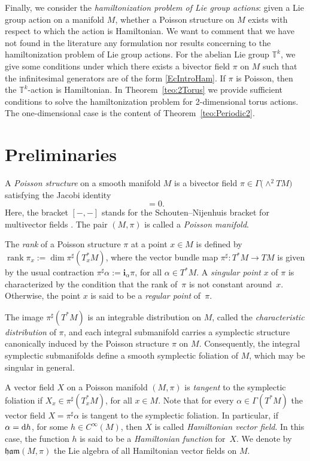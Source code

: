 \documentclass[10pt,a4paper]{amsart}
\newcommand{\dd}{{\rm d}}
\newcommand{\ii}{\mathbf{i}}
\numberwithin{equation}{section}
\begin{document}
Finally, we consider the \emph{hamiltonization problem of Lie group actions}: given a Lie group action on a manifold $M$, whether a Poisson structure on $M$ exists with respect to which the action is Hamiltonian. We want to comment that we have not found in the literature any formulation nor results concerning to the hamiltonization problem of Lie group actions. For the abelian Lie group $\mathbb{T}^k$, we give some conditions under which there exists a bivector field $\pi$ on $M$ such that the infinitesimal generators are of the form \eqref{EcIntroHam}. If $\pi$ is Poisson, then the $\mathbb{T}^k$-action is Hamiltonian. In Theorem~\ref{teo:2Torus} we provide sufficient conditions to solve the hamiltonization problem for 2-dimensional torus actions. The one-dimensional case is the content of Theorem~\ref{teo:Periodic2}.

\section{Preliminaries} %

A \emph{Poisson structure} on a smooth manifold $M$ is a bivector field $\pi \in \Gamma \big({\wedge}^2 TM\big)$ satisfying the Jacobi identity
 \begin{equation*}
 [\pi,\pi] = 0.
 \end{equation*}
Here, the bracket $[-,-]$ stands for the Schouten--Nijenhuis bracket for multivector fields \cite[Section~1.8]{DZ}. The pair $(M,\pi)$ is called a \emph{Poisson manifold}.

The \emph{rank} of a Poisson structure $\pi$ at a point $x \in M$ is defined by $\operatorname{rank}\pi_{x} := \dim\pi^{\sharp}(T^{\ast}_{x}M)$, where the vector bundle map $\pi^{\sharp}\colon T^{*}M \to TM$ is given by the usual contraction $\pi^{\sharp}\alpha := \ii_{\alpha}\pi$, for all $\alpha \in T^{\ast}M$. A \emph{singular point} $x$ of $\pi$ is characterized by the condition that the rank of~$\pi$ is not constant around~$x$. Otherwise, the point $x$ is said to be a \emph{regular point} of~$\pi$.

The image $\pi^{\sharp}(T^{\ast}M)$ is an integrable distribution on $M$, called the \emph{characteristic distribution} of $\pi$, and each integral submanifold carries a symplectic structure canonically induced by the Poisson structure $\pi$ on $M$. Consequently, the integral symplectic submanifolds define a smooth symplectic foliation of $M$, which may be singular in general.

A vector field $X$ on a Poisson manifold $(M,\pi)$ is \emph{tangent} to the symplectic foliation if $X_{x} \in \pi^{\sharp}(T^{*}_{x}M)$, for all $x \in M$. Note that for every $\alpha \in \Gamma(T^{*}M)$ the vector field $X = \pi^{\sharp}\alpha$ is tangent to the symplectic foliation. In particular, if $\alpha = \dd{h}$, for some $h \in C^{\infty}(M)$, then $X$ is called \emph{Hamiltonian vector field}. In this case, the function $h$ is said to be a \emph{Hamiltonian function} for~$X$. We denote by $\mathfrak{ham}(M,\pi)$ the Lie algebra of all Hamiltonian vector fields on $M$.
\end{document}
